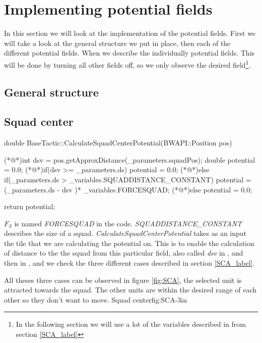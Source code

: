{\color[rgb]{0.000000,0.000000,0.000000}\section{Implementing potential fields}
	In this section we will look at the implementation of the potential fields.
	First we will take a look at the general structure we put in place, then each of the different potential fields. When we describe the individually potential fields. This will be done by turning all other fields off, so we only observe the desired field\footnote{In the following section we will use a lot of the variables described in from section \ref{SCA_label}}.
	
	\subsection{General structure}
	
	
	
	\subsection{Squad center}	
		\begin{Sourcecode}[caption=Squad center]
double BaseTactic::CalculateSquadCenterPotential(BWAPI::Position pos)
{
	(*@\lnote@*)int dsv = pos.getApproxDistance(_parameters.squadPos);	
	double potential = 0.0;
	(*@\lnote@*)if(dsv >= _parameters.ds)
		potential = 0.0;
	(*@\lnote@*)else if(_parameters.ds > _variables.SQUADDISTANCE_CONSTANT)
		potential = (_parameters.ds - dsv )* _variables.FORCESQUAD;
	(*@\lnote@*)else
		potential = 0.0;

	return potential;
}
\end{Sourcecode}
		$F_{S}$ is named \textit{FORCESQUAD} in the code.
		\textit{SQUADDISTANCE\_CONSTANT} describes the size of a squad. 
		\textit{CalculateSquadCenterPotential} takes as an input the tile that we are calculating the potential on. This is to enable the calculation of distance to the the squad from this particular field, also called \textit{dsv} in , and then in , and  we check the three different cases described in section \ref{SCA_label}.		
		
		All theses three cases can be observed in figure \ref{fig:SCA}, the selected unit is attracted towards the squad. The other units are within the desired range of each other so they don't want to move.
			{Squad center}{fig:SCA}{-3in}
				 
}
